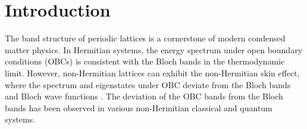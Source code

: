 \documentclass[pdflatex,sn-nature,iicol]{sn-jnl}
\theoremstyle{thmstyleone}%
\theoremstyle{thmstyletwo}%
\theoremstyle{thmstylethree}%
\begin{document}
\maketitle

\def\rmd{\mathrm{d}}%
\def\rme{\mathrm{e}}%
\def\rmi{\mathrm{i}}%

\section{Introduction}

The band structure of periodic lattices is a cornerstone of modern
condensed matter physics. In Hermitian systems, the energy spectrum
under open boundary conditions (OBCs) is consistent with the Bloch
bands in the thermodynamic limit. However, non-Hermitian lattices
can exhibit the non-Hermitian skin effect, where the spectrum and
eigenstates under OBC deviate from the Bloch bands and Bloch wave
functions \cite{leeAnomalousEdgeState2016,yaoEdgeStatesTopological2018}.
The deviation of the OBC bands from the Bloch bands has been observed
in various non-Hermitian classical \cite{helbigGeneralizedBulkBoundary2020,hofmannReciprocalSkinEffect2020,weidemannTopologicalFunnelingLight2020,wangGeneratingArbitraryTopological2021,zhangObservationHigherorderNonHermitian2021,zouObservationHybridHigherorder2021,liuComplexSkinModes2022,guTransientNonHermitianSkin2022,wangExtendedStateLocalized2022,shangExperimentalIdentificationSecondOrder2022,liuExperimentalObservationNonHermitian2023,wuEvidencingNonBlochDynamics2023,zhangElectricalCircuitRealization2023,zhuHigherRankChirality2023,liuLocalizationChiralEdge2024,liObservationGaugeField2025}
and quantum \cite{xiaoNonHermitianBulkBoundary2020,wangDetectingNonBlochTopological2021,xiaoObservationNonBlochParityTime2021,zhangObservationNonHermitianTopology2021,linObservationNonHermitianTopological2022,linTopologicalPhaseTransitions2022,chuBroadColossalEdge2023,ochkanNonHermitianTopologyMultiterminal2024,zhaoTwodimensionalNonHermitianSkin2025}
systems.
\end{document}
